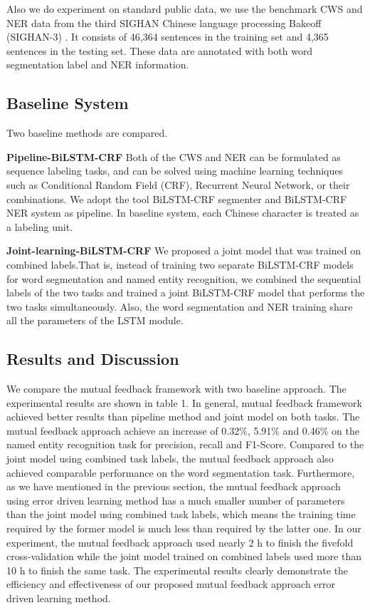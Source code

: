 \documentclass[conference]{IEEEtran}
\begin{document}
Also we do experiment on standard public data, we use the benchmark CWS and NER data from the third SIGHAN Chinese language processing Bakeoff (SIGHAN-3) \cite{nn}. It consists of 46,364 sentences in the training set and 4,365 sentences in the testing set. These data are annotated with both word segmentation label and NER information.
\subsection{Baseline System}
Two baseline methods are compared.

\textbf{Pipeline-BiLSTM-CRF} Both of the CWS and NER can be formulated as sequence labeling tasks, and can be solved using machine learning techniques such as Conditional Random Field (CRF), Recurrent Neural Network, or their combinations.
We adopt the tool BiLSTM-CRF segmenter and BiLSTM-CRF NER system as pipeline. In baseline system, each Chinese character is treated as a labeling unit.

\textbf{Joint-learning-BiLSTM-CRF} 
We proposed a joint model that was trained on combined labels.That is, instead of training two separate BiLSTM-CRF models for word segmentation and named entity recognition, we combined the sequential labels of the two tasks and trained a joint BiLSTM-CRF model that performs the two tasks simultaneously. Also, the word segmentation and NER training share all the parameters of the LSTM module.

\subsection{Results and Discussion}
We compare the mutual feedback framework with two baseline approach. The experimental results are shown in table 1. In general, mutual feedback framework achieved better results than pipeline method and joint
model on both tasks. The mutual feedback approach achieve an increase of 0.32\%, 5.91\% and 0.46\% on the
named entity recognition task for precision, recall and F1-Score.
Compared to the joint model using combined task labels,
the mutual feedback approach also achieved comparable performance on
the word segmentation task. Furthermore, as we have mentioned
in the previous section, the mutual feedback approach using error driven learning method has a much smaller number of parameters
than the joint model using combined task labels, which
means the training time required by the former model is much
less than required by the latter one. In our experiment, the mutual feedback approach used nearly 2 h to finish the
fivefold cross-validation while the joint model trained on combined
labels used more than 10 h to finish the same task. The experimental results clearly demonstrate the efficiency and effectiveness of our proposed mutual feedback approach error driven learning method.
\end{document}
